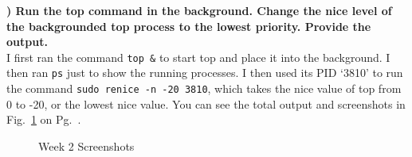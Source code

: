 \documentclass{report}
\newcommand{\mysubsection}[2]{\textbf{\romannumeral #1) #2}}
\begin{document}
\noindent\mysubsection{4}{Run the top command in the background. Change the nice
level of the backgrounded top process to the lowest priority. Provide
the output.}\\
I first ran the command {\scriptsize{\verb$top &$}\normalsize} to start top and
place it into the background. I then ran {\scriptsize{\verb$ps$}\normalsize}
just to show the running processes. I then used its PID `3810' to run the
command {\scriptsize{\verb$sudo renice -n -20 3810$}\normalsize}, which takes
the nice value of top from 0 to -20, or the lowest nice value. You can see the
total output and screenshots in Fig.~\ref{Week2} 
on Pg.~\pageref{Week2}.


\begin{figure}[!hbt]\centering
  \par
{}\par
{}\par
{}\par
\caption{Week 2 Screenshots}\label{Week2}
\end{figure}



\end{document}
